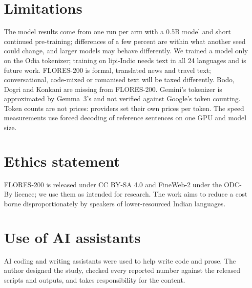 \documentclass[11pt]{article}
\begin{document}
\section*{Limitations}

The model results come from one run per arm with a 0.5B model and short continued pre-training;
differences of a few percent are within what another seed could change, and larger models may behave
differently. We trained a model only on the Odia tokenizer; training on lipi-Indic needs text in all
24 languages and is future work. FLORES-200 is formal, translated news and travel text;
conversational, code-mixed or romanised text will be taxed differently. Bodo, Dogri and Konkani are
missing from FLORES-200. Gemini's tokenizer is approximated by Gemma~3's and not verified against
Google's token counting. Token counts are not prices: providers set their own prices per token. The
speed measurements use forced decoding of reference sentences on one GPU and model size.

\section*{Ethics statement}

FLORES-200 is released under CC BY-SA 4.0 and FineWeb-2 under the ODC-By licence; we use them as
intended for research. The work aims to reduce a cost borne disproportionately by speakers of
lower-resourced Indian languages.

\section*{Use of AI assistants}

AI coding and writing assistants were used to help write code and prose. The author designed the
study, checked every reported number against the released scripts and outputs, and takes
responsibility for the content.


\end{document}
